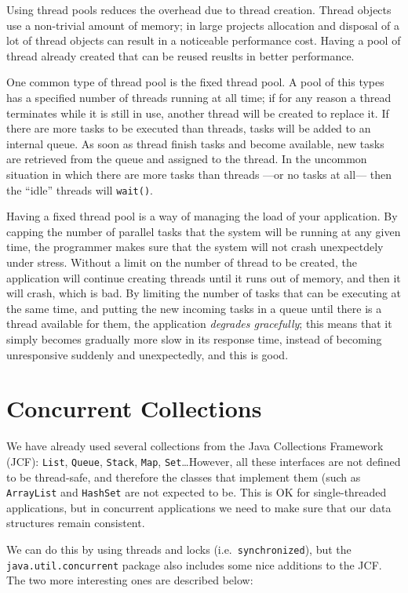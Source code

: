 Using thread pools reduces the overhead due to thread creation. Thread
objects use a non-trivial amount of memory; in large projects
allocation and disposal of a lot of thread objects can result in a
noticeable performance cost. Having a pool of thread already created
that can be reused reuslts in better performance. 

One common type of thread pool is the fixed thread pool. A pool of
this types has a specified number of threads running at all time; if
for any reason a thread terminates while it is still in use, another
thread will be created to replace it. If there are more tasks to be
executed than threads, tasks will be added to an internal queue. As
soon as thread finish tasks and become available, new tasks are
retrieved from the queue and assigned to the thread. In the uncommon
situation in which there are more tasks than threads ---or no tasks at
all--- then the ``idle'' threads will \verb+wait()+.

Having a fixed thread pool is a way of managing the load of your
application. By capping the number of parallel tasks that the system
will be running at any given time, the programmer makes sure that the
system will not crash unexpectdely under stress. Without a limit on
the number of thread to be created, the application will continue
creating threads until it runs out of memory, and then it will crash,
which is bad. By limiting the number of tasks that can be executing at
the same time, and putting the new incoming tasks in a queue until
there is a thread available for them, the application \emph{degrades
  gracefully}; this means that it simply becomes gradually more slow
in its response time, instead of becoming unresponsive suddenly and
unexpectedly, and this is good.

\section{Concurrent Collections}
\label{sec:conc-coll}

We have already used several collections from the Java Collections
Framework (JCF): \verb+List+, \verb+Queue+, \verb+Stack+, \verb+Map+,
\verb+Set+\ldots However, all these interfaces are not defined to be
thread-safe, and therefore the classes that implement them (such as
\verb+ArrayList+ and \verb+HashSet+ are not expected to be. This is OK
for single-threaded applications, but in concurrent applications we
need to make sure that our data structures remain consistent. 

We can do this by using threads and locks (i.e.~\verb+synchronized+),
but the \verb+java.util.concurrent+ package also includes some nice
additions to the JCF. The two more interesting ones are described
below: 


